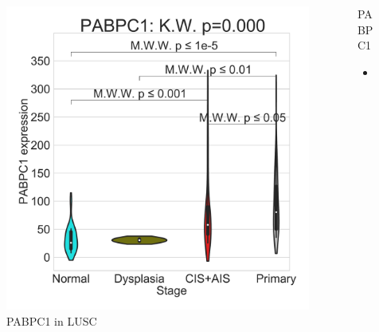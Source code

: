 \documentclass{beamer}
\begin{document}
\begin{frame}[allowframebreaks]
                    \begin{columns}
                        \begin{column}{0.4 \textwidth}
                            \begin{figure}
                                \includegraphics[width=\linewidth]{figures/DEG/Violin/STAR.TPM.SQC.violin/PABPC1.pdf}
                                \caption{PABPC1 in LUSC}
                            \end{figure}
                        \end{column}
                        \begin{column}{0.55 \textwidth}
                            \begin{block}{PABPC1}
                                \begin{itemize}
                                    \item
                                \end{itemize}
                            \end{block}
                        \end{column}
                    \end{columns}


\end{frame}
\end{document}
